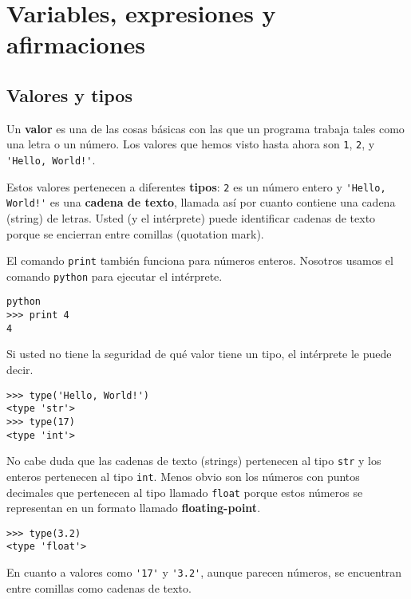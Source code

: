 
\chapter{Variables, expresiones y afirmaciones}

\section{Valores y tipos}

Un {\bf valor} es una de las cosas b\'asicas con las que un programa trabaja tales como una letra o un n\'umero.  Los valores que hemos visto hasta ahora son {\tt 1}, {\tt 2}, y
\verb"'Hello, World!'".

Estos valores pertenecen a diferentes {\bf tipos}:
{\tt 2} es un n\'umero entero y \verb"'Hello, World!'" es una {\bf cadena de texto},
llamada as\'i por cuanto contiene una cadena (string) de letras.
Usted (y el int\'erprete) puede identificar cadenas de texto porque se encierran entre comillas (quotation mark).


El comando {\tt print} tambi\'en funciona para n\'umeros enteros.  Nosotros usamos el comando  
{\tt python} para ejecutar el int\'erprete.

\beforeverb
\begin{verbatim}
python
>>> print 4
4
\end{verbatim}
\afterverb
%
Si usted no tiene la seguridad de qu\'e valor tiene un tipo, el int\'erprete le puede decir.

\beforeverb
\begin{verbatim}
>>> type('Hello, World!')
<type 'str'>
>>> type(17)
<type 'int'>
\end{verbatim}
\afterverb
%
No cabe duda que las cadenas de texto (strings) pertenecen al tipo {\tt str} y los enteros pertenecen al tipo {\tt int}.  Menos obvio son los n\'umeros con puntos decimales que pertenecen al tipo llamado {\tt float}
porque estos n\'umeros se representan en un formato llamado {\bf floating-point}.


\beforeverb
\begin{verbatim}
>>> type(3.2)
<type 'float'>
\end{verbatim}
\afterverb
%
En cuanto a valores como \verb"'17'" y \verb"'3.2'", aunque parecen n\'umeros, se encuentran entre comillas como cadenas de texto. 


